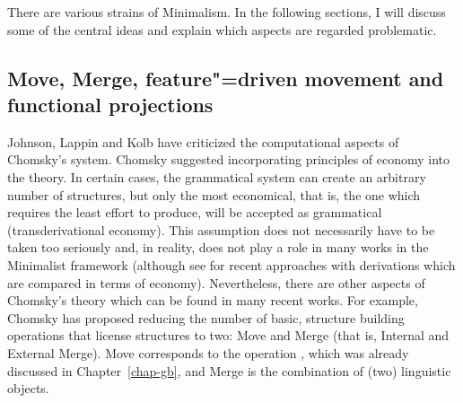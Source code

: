 \largerpage
There are various strains of Minimalism. In the following sections, I will discuss some of the
central ideas and explain which aspects are regarded problematic.

\subsection{Move, Merge, feature"=driven movement and functional projections}
\label{Abschnitt-merkmalsgetriebene-Bewegung}
\label{Abschnitt-MP-funktionale-Projektionen}\label{sec-functional-projections-minimalism}
\label{Abschnitt-Kaynesche-Modelle}

Johnson, Lappin and Kolb have criticized the computational aspects of Chomsky's system. Chomsky suggested incorporating principles of economy into
the theory. In certain cases, the grammatical system can create an arbitrary number of structures, but only the most economical, that is, the one which
requires the least effort to produce, will be accepted as grammatical (transderivational economy). This assumption
does not necessarily have to be taken too seriously and, in reality, does not play a role in many works in the Minimalist framework (although see
\citet{Richards2015a} for recent approaches with derivations which are compared in terms of economy). Nevertheless, there are other aspects of 
Chomsky's theory which can be found in many recent works. For example, Chomsky has proposed reducing
the number of basic, structure building operations that license structures to two: Move and Merge (that is, Internal and External Merge).
Move corresponds to the operation \movea, which was already discussed in Chapter~\ref{chap-gb}, and
Merge is the combination of (two) linguistic objects.

